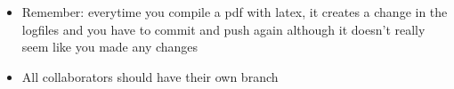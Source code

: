 \documentclass{article}
\begin{document}
    \begin{itemize}
        \item Remember: everytime you compile a pdf with latex, it creates a change in the logfiles and you have to commit and push again although it doesn't really seem like you made any changes
        \item All collaborators should have their own branch
    \end{itemize}
\end{document}
